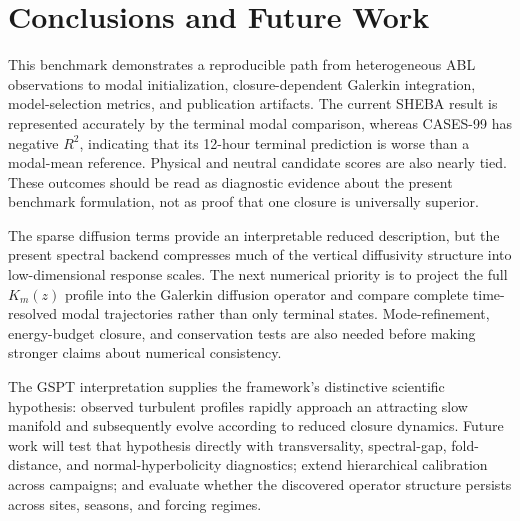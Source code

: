 \documentclass[11pt,a4paper]{article}
\begin{document}
\begin{table}[H]
    \centering
    \small
    \caption{Software environment and execution metadata for this report build.}
    \label{tab:reproducibility}
    \resizebox{\linewidth}{!}{}
\end{table}

\section{Conclusions and Future Work}

This benchmark demonstrates a reproducible path from heterogeneous ABL observations to modal initialization, closure-dependent Galerkin integration, model-selection metrics, and publication artifacts. The current SHEBA result is represented accurately by the terminal modal comparison, whereas CASES-99 has negative $R^2$, indicating that its 12-hour terminal prediction is worse than a modal-mean reference. Physical and neutral candidate scores are also nearly tied. These outcomes should be read as diagnostic evidence about the present benchmark formulation, not as proof that one closure is universally superior.

The sparse diffusion terms provide an interpretable reduced description, but the present spectral backend compresses much of the vertical diffusivity structure into low-dimensional response scales. The next numerical priority is to project the full $K_m(z)$ profile into the Galerkin diffusion operator and compare complete time-resolved modal trajectories rather than only terminal states. Mode-refinement, energy-budget closure, and conservation tests are also needed before making stronger claims about numerical consistency.

The GSPT interpretation supplies the framework's distinctive scientific hypothesis: observed turbulent profiles rapidly approach an attracting slow manifold and subsequently evolve according to reduced closure dynamics. Future work will test that hypothesis directly with transversality, spectral-gap, fold-distance, and normal-hyperbolicity diagnostics; extend hierarchical calibration across campaigns; and evaluate whether the discovered operator structure persists across sites, seasons, and forcing regimes.
\end{document}
